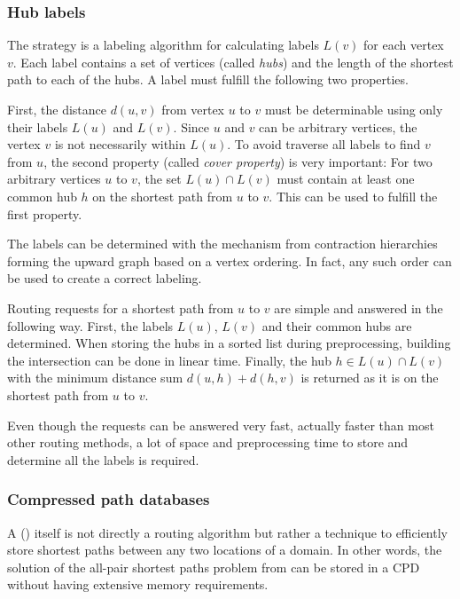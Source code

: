 		\subsubsection{Hub labels}
		
			The  strategy\cite{bast-transportation-networks} is a labeling algorithm for calculating labels $L(v)$ for each vertex $v$.
			Each label contains a set of vertices (called \emph{hubs}) and the length of the shortest path to each of the hubs.
			A label must fulfill the following two properties.
			
			First, the distance $d(u, v)$ from vertex $u$ to $v$ must be determinable using only their labels $L(u)$ and $L(v)$.
			Since $u$ and $v$ can be arbitrary vertices, the vertex $v$ is not necessarily within $L(u)$.
			To avoid traverse all labels to find $v$ from $u$, the second property (called \emph{cover property}) is very important:
			For two arbitrary vertices $u$ to $v$, the set $L(u) \cap L(v)$ must contain at least one common hub $h$ on the shortest path from $u$ to $v$.
			This can be used to fulfill the first property.
			
			The labels can be determined with the mechanism from contraction hierarchies forming the upward graph based on a vertex ordering.
			In fact, any such order can be used to create a correct labeling.

			Routing requests for a shortest path from $u$ to $v$ are simple and answered in the following way.
			First, the labels $L(u)$, $L(v)$ and their common hubs are determined.
			When storing the hubs in a sorted list during preprocessing, building the intersection can be done in linear time.
			Finally, the hub $h \in L(u) \cap L(v)$ with the minimum distance sum $d(u, h) + d(h, v)$ is returned as it is on the shortest path from $u$ to $v$.
			
			Even though the requests can be answered very fast, actually faster than most other routing methods, a lot of space and preprocessing time to store and determine all the labels is required.
			
		
		\subsubsection{Compressed path databases}
		\label{subsubsec:cpd}
		
			A  () itself is not directly a routing algorithm but rather a technique to efficiently store shortest paths between any two locations of a domain\cite{botea-cpd-2013}.
			In other words, the solution of the all-pair shortest paths problem from  can be stored in a CPD without having extensive memory requirements.
			
